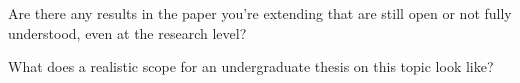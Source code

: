 \begin{solution}
\end{solution}

\begin{question}
  Are there any results in the paper you're extending that are still open or not fully understood, even at the research level?
\end{question}

\begin{solution}
\end{solution}

\begin{question}
  What does a realistic scope for an undergraduate thesis on this topic look like?
\end{question}

\begin{solution}
\end{solution}
